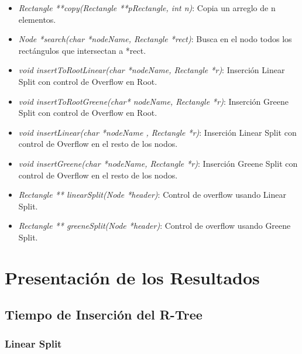 \documentclass[letterpaper,10pt]{article}
\begin{document}
\begin{itemize}
		\item \textit{Rectangle **copy(Rectangle **pRectangle, int n)}: Copia un arreglo de n elementos.
		\item \textit{Node *search(char *nodeName, Rectangle *rect)}: Busca en el nodo todos los rectángulos que intersectan a *rect.
		\item \textit{void insertToRootLinear(char *nodeName, Rectangle *r)}: Inserción Linear Split con control de Overflow en Root.
		\item \textit{void insertToRootGreene(char* nodeName, Rectangle *r)}: Inserción Greene Split con control de Overflow en Root.
		\item \textit{void insertLinear(char *nodeName , Rectangle *r)}: Inserción Linear Split con control de Overflow en el resto de los nodos.
		\item \textit{void insertGreene(char *nodeName, Rectangle *r)}: Inserción Greene Split con control de Overflow en el resto de los nodos.
		\item \textit{Rectangle ** linearSplit(Node *header)}: Control de overflow usando Linear Split.
		\item \textit{Rectangle ** greeneSplit(Node *header)}: Control de overflow usando Greene Split.
	\end{itemize}

	\newpage

	\section{Presentación de los Resultados}

	\subsection{Tiempo de Inserción del R-Tree}
	\subsubsection{Linear Split}
\end{document}
